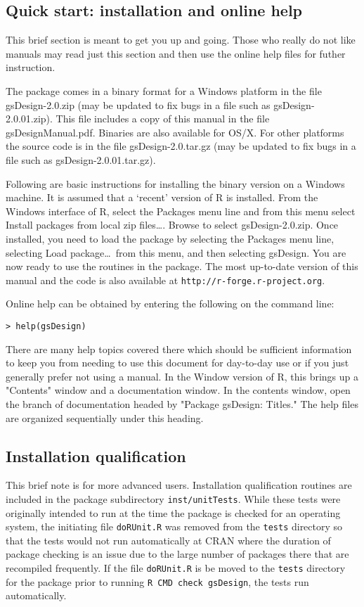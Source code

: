 \subsection{Quick start: installation and online help\label{sec:quickstart}}
This brief section is meant to get you up and going. Those who really do not like manuals may read just this section and then use the online help files for futher instruction.

The package comes in a binary format for a Windows platform in the file
gsDesign-2.0.zip (may be updated to fix bugs in a file such as
gsDesign-2.0.01.zip). This file includes a copy of this manual in the file
gsDesignManual.pdf. 
Binaries are also available for OS/X. For other platforms the source code is in the file gsDesign-2.0.tar.gz (may be updated to fix bugs in
a file such as gsDesign-2.0.01.tar.gz). 

Following are basic instructions for
installing the binary version on a Windows machine. It is assumed that a
`recent' version of R is installed. From the Windows interface of R, select
the Packages menu line and from this menu select Install packages from local
zip files\ldots. Browse to select gsDesign-2.0.zip. Once installed, you need
to load the package by selecting the Packages menu line, selecting Load
package\ldots\ from this menu, and then selecting gsDesign. You are now ready
to use the routines in the package. The most up-to-date version of this manual
and the code is also available at \texttt{http://r-forge.r-project.org}.

\bigskip

Online help can be obtained by entering the following on the command line:

\bigskip
\begin{verbatim}
> help(gsDesign)
\end{verbatim}
\bigskip

There are many help topics covered there which should be sufficient
information to keep you from needing to use this document for day-to-day use or if you just generally prefer not using a manual.
In the Window version of R, this brings up a "Contents" window and a
documentation window. In the contents window, open the branch of documentation
headed by "Package gsDesign: Titles." The help files are organized
sequentially under this heading. 

\subsection{Installation qualification}
This brief note is for more advanced users. Installation qualification routines are included in the package subdirectory {\tt inst/unitTests}. While these tests were originally intended to run at the time the package is checked for an operating system, the initiating file  {\tt doRUnit.R} was removed from the {\tt tests} directory so that the tests would not run automatically at CRAN where the duration of package checking is an issue due to the large number of packages there that are recompiled frequently. If the file {\tt doRUnit.R} is be moved to the {\tt tests} directory for the package prior to running {\tt R CMD check gsDesign}, the tests run automatically.
 

